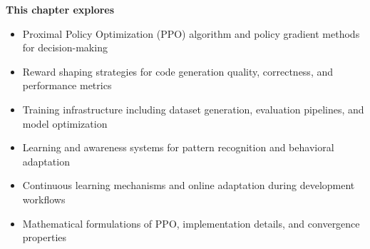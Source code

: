 
\begin{tcolorbox}[
    enhanced,
    colback=white,
    colframe=brandPrimary!40,
    boxrule=1pt,
    arc=12pt,
    drop shadow={brandPrimary!20},
    left=1.5cm,
    right=1.5cm,
    top=1.2cm,
    bottom=1.2cm,
    before upper={\parindent0pt}
]
\begin{center}
{\Large\textbf{\textcolor{brandPrimary}{This chapter explores}}}
\end{center}

\vspace{0.8cm}

\begin{itemize}[leftmargin=1.2cm, itemsep=0.4cm, label={\textcolor{brandAccent}{$\triangleright$}}]
    \item {\large Proximal Policy Optimization (PPO) algorithm and policy gradient methods for decision-making}
    \item {\large Reward shaping strategies for code generation quality, correctness, and performance metrics}
    \item {\large Training infrastructure including dataset generation, evaluation pipelines, and model optimization}
    \item {\large Learning and awareness systems for pattern recognition and behavioral adaptation}
    \item {\large Continuous learning mechanisms and online adaptation during development workflows}
    \item {\large Mathematical formulations of PPO, implementation details, and convergence properties}
\end{itemize}
\end{tcolorbox}

\clearpage
